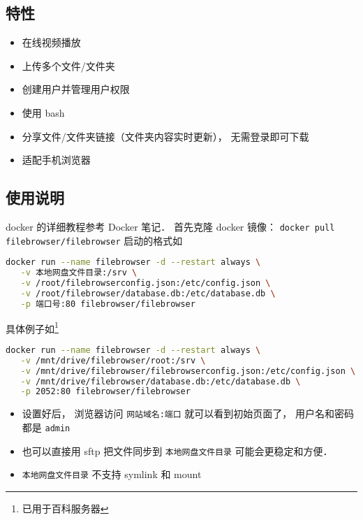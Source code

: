 
\begin{issues}
\issueDraft
\end{issues}

\subsection{特性}
\begin{itemize}
\item 在线视频播放
\item 上传多个文件/文件夹
\item 创建用户并管理用户权限
\item 使用 bash
\item 分享文件/文件夹链接（文件夹内容实时更新）， 无需登录即可下载
\item 适配手机浏览器
\end{itemize}

\subsection{使用说明}
docker 的详细教程参考 Docker 笔记． 首先克隆 docker 镜像： \verb|docker pull filebrowser/filebrowser|
启动的格式如
\begin{lstlisting}[language=bash]
docker run --name filebrowser -d --restart always \
   -v 本地网盘文件目录:/srv \
   -v /root/filebrowserconfig.json:/etc/config.json \
   -v /root/filebrowser/database.db:/etc/database.db \
   -p 端口号:80 filebrowser/filebrowser
\end{lstlisting}
具体例子如\footnote{已用于百科服务器}
\begin{lstlisting}[language=bash]
docker run --name filebrowser -d --restart always \
   -v /mnt/drive/filebrowser/root:/srv \
   -v /mnt/drive/filebrowser/filebrowserconfig.json:/etc/config.json \
   -v /mnt/drive/filebrowser/database.db:/etc/database.db \
   -p 2052:80 filebrowser/filebrowser
\end{lstlisting}

\begin{itemize}
\item 设置好后， 浏览器访问 \verb`网站域名:端口` 就可以看到初始页面了， 用户名和密码都是 \verb`admin`
\item 也可以直接用 sftp 把文件同步到 \verb`本地网盘文件目录` 可能会更稳定和方便．
\item \verb`本地网盘文件目录` 不支持 symlink 和 mount
\end{itemize}

